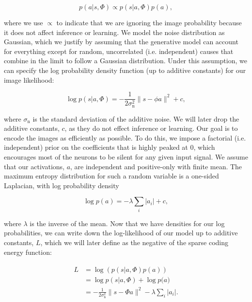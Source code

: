 \begin{equation}\label{eq:ch2_bayes}
    p(a|s,\Phi) \propto p(s|a,\Phi) p(a),
\end{equation}

\noindent where we use $\propto$ to indicate that we are ignoring the image probability because it does not affect inference or learning. We model the noise distribution as Gaussian, which we justify by assuming that the generative model can account for everything except for random, uncorrelated (i.e. independent) causes that combine in the limit to follow a Gaussian distribution. Under this assumption, we can specify the log probability density function (up to additive constants) for our image likelihood:

\begin{equation}\label{eq:ch2_image_likelihood}
    \log p(s|a,\Phi) = -\frac{1}{2\sigma_{\text{n}}^{2}}\|s-\phi a\|^{2} + c,
\end{equation}

\noindent where $\sigma_{\text{n}}$ is the standard deviation of the additive noise. We will later drop the additive constants, $c$, as they do not effect inference or learning. Our goal is to encode the images as efficiently as possible. To do this, we impose a factorial (i.e. independent) prior on the coefficients that is highly peaked at 0, which encourages most of the neurons to be silent for any given input signal. We assume that our activations, $a$, are independent and positive-only with finite mean. The maximum entropy distribution for such a random variable is a one-sided Laplacian, with log probability density

\begin{equation}\label{eq:ch2_coefficient_prior}
    \log p(a) = -\lambda\sum_{i}|a_{i}| + c,
\end{equation}

\noindent where $\lambda$ is the inverse of the mean. Now that we have densities for our log probabilities, we can write down the log-likelihood of our model up to additive constants, $L$, which we will later define as the negative of the sparse coding energy function:

\begin{align}\label{eq:ch2_log_likelihood}
\begin{split}
    L &= \log\left(p(s|a,\Phi)p(a)\right) \\
      &= \log{p(s|a,\Phi)} + \log{p(a}) \\
      &= -\frac{1}{2\sigma_{\text{n}}^{2}}\|s - \Phi a\|^{2} - \lambda \sum_{i}|a_{i}|.
\end{split}
\end{align}

